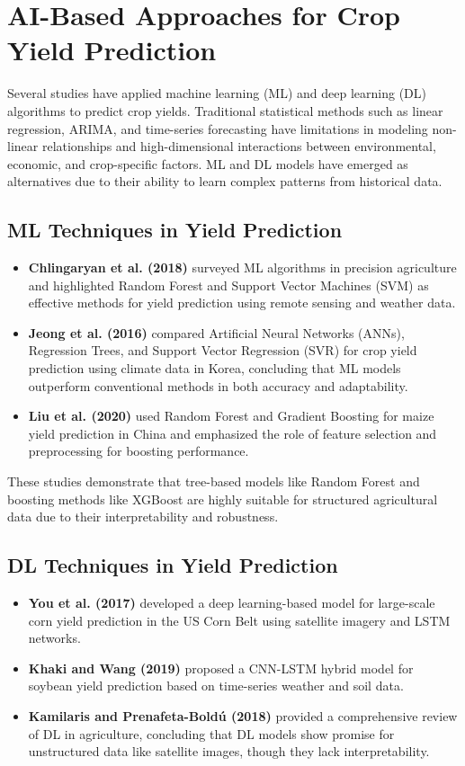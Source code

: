 \documentclass[a4paper,11pt,oneside]{book}
\begin{document}
\section{AI-Based Approaches for Crop Yield Prediction}

Several studies have applied machine learning (ML) and deep learning (DL) algorithms to predict crop yields. Traditional statistical methods such as linear regression, ARIMA, and time-series forecasting have limitations in modeling non-linear relationships and high-dimensional interactions between environmental, economic, and crop-specific factors. ML and DL models have emerged as alternatives due to their ability to learn complex patterns from historical data.

\subsection{ML Techniques in Yield Prediction}

\begin{itemize}
    \item \textbf{Chlingaryan et al. (2018)} surveyed ML algorithms in precision agriculture and highlighted Random Forest and Support Vector Machines (SVM) as effective methods for yield prediction using remote sensing and weather data.
    \item \textbf{Jeong et al. (2016)} compared Artificial Neural Networks (ANNs), Regression Trees, and Support Vector Regression (SVR) for crop yield prediction using climate data in Korea, concluding that ML models outperform conventional methods in both accuracy and adaptability.
    \item \textbf{Liu et al. (2020)} used Random Forest and Gradient Boosting for maize yield prediction in China and emphasized the role of feature selection and preprocessing for boosting performance.
\end{itemize}

These studies demonstrate that tree-based models like Random Forest and boosting methods like XGBoost are highly suitable for structured agricultural data due to their interpretability and robustness.

\subsection{DL Techniques in Yield Prediction}

\begin{itemize}
    \item \textbf{You et al. (2017)} developed a deep learning-based model for large-scale corn yield prediction in the US Corn Belt using satellite imagery and LSTM networks.
    \item \textbf{Khaki and Wang (2019)} proposed a CNN-LSTM hybrid model for soybean yield prediction based on time-series weather and soil data.
    \item \textbf{Kamilaris and Prenafeta-Boldú (2018)} provided a comprehensive review of DL in agriculture, concluding that DL models show promise for unstructured data like satellite images, though they lack interpretability.
\end{itemize}
\end{document}
